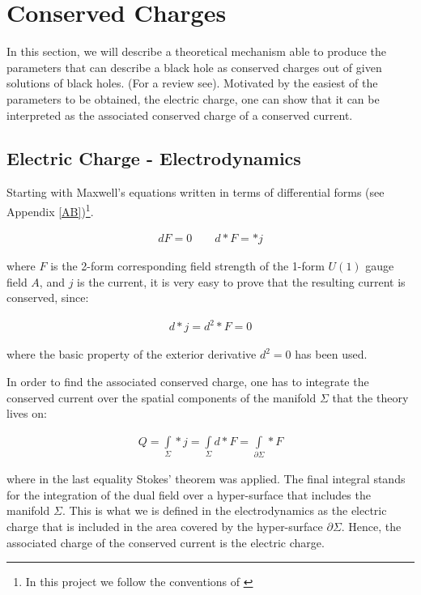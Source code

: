 \documentclass[a4paper,notitlepage]{report}
\begin{document}
\section{Conserved Charges}

In this section, we will describe a theoretical mechanism able to produce the parameters that can describe a black hole as conserved charges out of given solutions of black holes. (For a review see\cite{carroll2004spacetime,townsend1997black}). Motivated by the easiest of the parameters to be obtained, the electric charge, one can show that it can be interpreted as the associated conserved charge of a conserved current.

\subsection{Electric Charge - Electrodynamics}

Starting with Maxwell's equations written in terms of differential forms (see Appendix \ref{AB})\footnote{In this project we follow the conventions of \cite{danielsson2009towards}}.

\begin{align}
dF = 0 \qquad d*F = *j
\end{align}

\vspace{0.5 em}
where $F$ is the 2-form corresponding field strength of the 1-form $U(1)$ gauge field $A$, and $j$ is the current, it is very easy to prove that the resulting current is conserved, since:

\begin{align}
d*j = d^2 *F = 0
\end{align}

\vspace{0.5 em}
where the basic property of the exterior derivative $d^2=0$ has been used. 

In order to find the associated conserved charge, one has to integrate the conserved current over the spatial components of the manifold $\Sigma$ that the theory lives on:

\begin{align}
Q = \int\limits_{\Sigma} *j = \int\limits_{\Sigma} d*F = \int\limits_{\partial\Sigma} *F
\end{align}

\vspace{0.5 em}
where in the last equality Stokes' theorem was applied. The final integral stands for the integration of the dual field over a hyper-surface that includes the manifold $\Sigma$. This is what we is defined in the electrodynamics as the electric charge that is included in the area covered by the hyper-surface $\partial\Sigma$. Hence, the associated charge of the conserved current is the electric charge.
\end{document}
